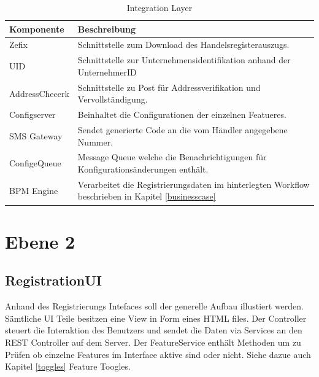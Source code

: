 \begin{table}[H]
	\centering
	\caption{Integration Layer}
	\begin{tabular}{ | p{4cm} | p{12cm} | }
		\toprule
		{\textbf{Komponente}} & {\textbf{Beschreibung}} \\
		\midrule
		Zefix &  Schnittstelle zum Download des Handelsregisterauszugs. \\ \hline
		UID &  Schnittstelle zur Unternehmensidentifikation anhand der UnternehmerID \\ \hline
		AddressChecerk &  Schnittstelle zu Post für Addressverifikation und Vervollständigung. \\ \hline
		Configserver &  Beinhaltet die Configurationen der einzelnen Featueres. \\ \hline
		SMS Gateway &  Sendet generierte Code an die vom Händler angegebene Nummer. \\ \hline
		ConfigeQueue & Message Queue welche die Benachrichtigungen für Konfigurationsänderungen enthält. \\ \hline
		BPM Engine & Verarbeitet die Registrierungsdaten im hinterlegten Workflow beschrieben in Kapitel \ref{businesscase}\\
		\bottomrule
	\end{tabular}
\end{table}
\newpage

\section{Ebene 2}

\subsection{RegistrationUI}
Anhand des Registrierungs Intefaces soll der generelle Aufbau illustiert werden. Sämtliche UI Teile besitzen eine View in Form eines HTML files. Der Controller steuert die Interaktion des Benutzers und sendet die Daten via Services an den REST Controller auf dem Server. Der FeatureService enthält Methoden um zu Prüfen ob einzelne Features im Interface aktive sind oder nicht. Siehe dazue auch Kapitel \ref{toggles} Feature Toogles.

